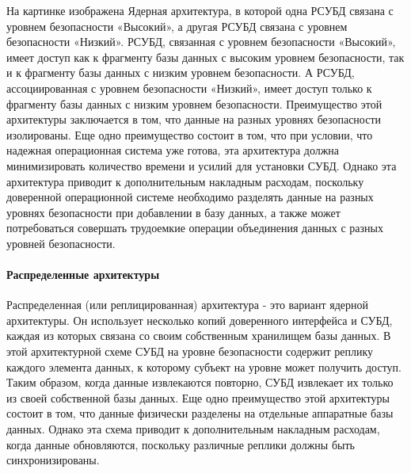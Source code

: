 На картинке изображена Ядерная архитектура, в которой одна РСУБД связана с уровнем безопасности «Высокий»,
а другая РСУБД связана с уровнем безопасности «Низкий».
РСУБД, связанная с уровнем безопасности «Высокий», имеет доступ как к фрагменту базы данных с высоким уровнем безопасности,
так и к фрагменту базы данных с низким уровнем безопасности. А РСУБД, ассоциированная с уровнем безопасности «Низкий»,
имеет доступ только к фрагменту базы данных с низким уровнем безопасности.
Преимущество этой архитектуры заключается в том, что данные на разных уровнях безопасности изолированы.
Еще одно преимущество состоит в том, что при условии, что надежная операционная система уже готова,
эта архитектура должна минимизировать количество времени и усилий для установки СУБД.
Однако эта архитектура приводит к дополнительным накладным расходам, поскольку доверенной
операционной системе необходимо разделять данные на разных уровнях безопасности при добавлении в базу данных,
а также может потребоваться совершать трудоемкие операции объединения данных с разных уровней безопасности.

\paragraph{Распределенные архитектуры}
Распределенная (или реплицированная) архитектура - это вариант ядерной архитектуры.
Он использует несколько копий доверенного интерфейса и СУБД, каждая из которых связана
со своим собственным хранилищем базы данных. В этой архитектурной схеме СУБД на уровне
безопасности содержит реплику каждого элемента данных, к которому субъект на уровне может получить доступ.
Таким образом, когда данные извлекаются повторно, СУБД извлекает их только из своей собственной базы данных.
Еще одно преимущество этой архитектуры состоит в том, что данные физически разделены на отдельные аппаратные базы данных.
Однако эта схема приводит к дополнительным накладным расходам, когда данные обновляются, поскольку различные
реплики должны быть синхронизированы.
